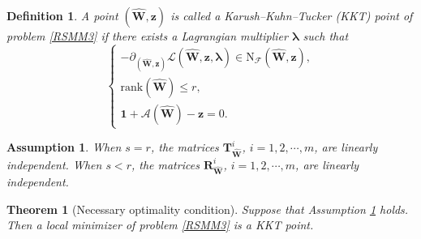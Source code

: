 \documentclass[10pt,a4paper]{amsart}
\newtheorem{definition}{Definition}
\newtheorem{assumption}{Assumption}
\newtheorem{theorem}{Theorem}
\begin{document}
\begin{definition}\label{stat}
	A point $(\hat{\mathbf{W}},\mathbf{z})$ is called a Karush–Kuhn–Tucker (KKT) point of problem \eqref{RSMM3} if there exists a Lagrangian multiplier $\bm{\lambda}$ such that
	\begin{equation*}
		\begin{cases}
			-\partial_{(\hat{\mathbf{W}},\mathbf{z})}\mathscr{L}(\hat{\mathbf{W}},\mathbf{z},\bm{\lambda})
			\in \mathrm{N}_{\mathcal{F}}(\hat{\mathbf{W}},\mathbf{z}),\\[4pt]
			\mathrm{rank}(\hat{\mathbf{W}}) \leq r,\\[4pt]
			\mathbf{1}+\mathscr{A}(\hat{\mathbf{W}})-\mathbf{z}=0.
		\end{cases}
	\end{equation*}
\end{definition}

\begin{assumption}\label{ass1}
When $s=r$, the matrices $\mathbf{T}_{\hat{\mathbf{W}}}^i$, $i=1,2,\cdots,m$, are linearly independent. When $s<r$, the matrices $\mathbf{R}_{\hat{\mathbf{W}}}^i$, $i=1,2,\cdots,m$, are linearly independent.
\end{assumption}

\begin{theorem}[Necessary optimality condition] Suppose that Assumption \ref{ass1} holds. Then a local minimizer of problem \eqref{RSMM3} is a KKT point.
\end{theorem}
\end{document}
